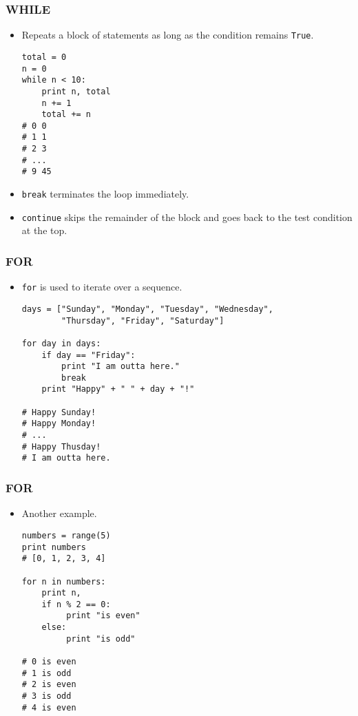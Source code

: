\documentclass{beamer}
\begin{document}
\begin{frame}[fragile]
\frametitle{WHILE}
\begin{itemize}
\item Repeats a block of statements
      as long as the condition remains \lstinline{True}.
\begin{lstlisting}
total = 0
n = 0
while n < 10:
    print n, total
    n += 1
    total += n
# 0 0
# 1 1
# 2 3
# ...
# 9 45
\end{lstlisting}
\item \lstinline{break} terminates the loop
      immediately.
\item \lstinline{continue} skips the remainder
      of the block and goes back to the test 
      condition at the top.
\end{itemize}
\end{frame}

\begin{frame}[fragile]
\frametitle{FOR}
\begin{itemize}
\item \lstinline{for} is used to iterate over a
      sequence.
\begin{lstlisting}
days = ["Sunday", "Monday", "Tuesday", "Wednesday",
        "Thursday", "Friday", "Saturday"]

for day in days:
    if day == "Friday":
        print "I am outta here."
        break
    print "Happy" + " " + day + "!"

# Happy Sunday!
# Happy Monday!
# ...
# Happy Thusday!
# I am outta here.
\end{lstlisting}
\end{itemize}
\end{frame}

\begin{frame}[fragile]
\frametitle{FOR}
\begin{itemize}
\item Another example.
\begin{lstlisting}
numbers = range(5)
print numbers
# [0, 1, 2, 3, 4]

for n in numbers:
    print n,
    if n % 2 == 0:
         print "is even"
    else:
         print "is odd" 

# 0 is even
# 1 is odd
# 2 is even
# 3 is odd
# 4 is even      
\end{lstlisting}
\end{itemize}
\end{frame}
\end{document}
